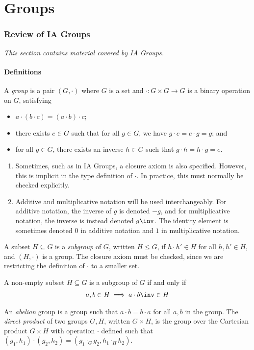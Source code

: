 \part{Groups}

\section{Review of IA Groups}

\textit{This section contains material covered by IA Groups.}

\subsection{Definitions}
A \textit{group} is a pair $(G, \cdot)$ where $G$ is a set and $\cdot \colon G \times G \to G$ is a binary operation on $G$, satisfying
\begin{itemize}
	\item $a \cdot (b \cdot c) = (a \cdot b) \cdot c$;
	\item there exists $e \in G$ such that for all $g \in G$, we have $g \cdot e = e \cdot g = g$; and
	\item for all $g \in G$, there exists an inverse $h \in G$ such that $g \cdot h = h \cdot g = e$.
\end{itemize}
\begin{remark}
	\begin{enumerate}
		\item Sometimes, such as in IA Groups, a closure axiom is also specified.
		      However, this is implicit in the type definition of $\cdot$.
		      In practice, this must normally be checked explicitly.
		\item Additive and multiplicative notation will be used interchangeably.
		      For additive notation, the inverse of $g$ is denoted $-g$, and for multiplicative notation, the inverse is instead denoted $g\inv$.
		      The identity element is sometimes denoted $0$ in additive notation and $1$ in multiplicative notation.
	\end{enumerate}
\end{remark}
A subset $H \subseteq G$ is a \textit{subgroup} of $G$, written $H \leq G$, if $h \cdot h' \in H$ for all $h, h' \in H$, and $(H, \cdot)$ is a group.
The closure axiom must be checked, since we are restricting the definition of $\cdot$ to a smaller set.
\begin{remark}
	A non-empty subset $H \subseteq G$ is a subgroup of $G$ if and only if
	\begin{align*}
		a, b \in H \implies a \cdot b\inv \in H
	\end{align*}
\end{remark}
An \textit{abelian} group is a group such that $a \cdot b = b \cdot a$ for all $a, b$ in the group.
The \textit{direct product} of two groups $G, H$, written $G \times H$, is the group over the Cartesian product $G \times H$ with operation $\cdot$ defined such that $(g_1, h_1) \cdot (g_2, h_2) = (g_1 \cdot_G g_2, h_1 \cdot_H h_2)$.

